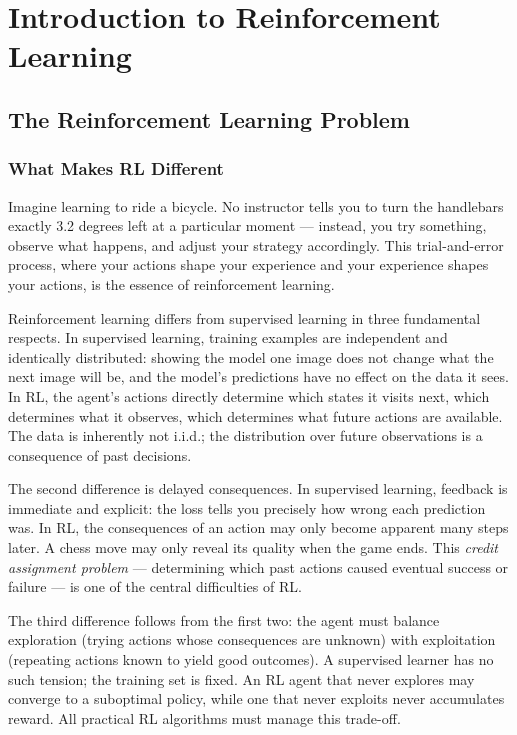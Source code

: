 \documentclass{book}
\begin{document}
\chapter{Introduction to Reinforcement Learning}
\label{ch:rl}

\section{The Reinforcement Learning Problem}
\label{sec:rl_problem}

\subsection{What Makes RL Different}
\label{sec:rl_different}

Imagine learning to ride a bicycle. No instructor tells you to turn the
handlebars exactly 3.2 degrees left at a particular moment --- instead,
you try something, observe what happens, and adjust your strategy
accordingly. This trial-and-error process, where your actions shape your
experience and your experience shapes your actions, is the essence of
reinforcement learning.

Reinforcement learning differs from supervised learning in three
fundamental respects. In supervised learning, training examples are
independent and identically distributed: showing the model one image does
not change what the next image will be, and the model's predictions have
no effect on the data it sees. In RL, the agent's actions directly
determine which states it visits next, which determines what it
observes, which determines what future actions are available. The data is
inherently not i.i.d.; the distribution over future observations is a
consequence of past decisions.

The second difference is delayed consequences. In supervised learning,
feedback is immediate and explicit: the loss tells you precisely how wrong
each prediction was. In RL, the consequences of an action may only become
apparent many steps later. A chess move may only reveal its quality when
the game ends. This \emph{credit assignment problem} --- determining which
past actions caused eventual success or failure --- is one of the central
difficulties of RL.

The third difference follows from the first two: the agent must balance
exploration (trying actions whose consequences are unknown) with
exploitation (repeating actions known to yield good outcomes). A supervised
learner has no such tension; the training set is fixed. An RL agent that
never explores may converge to a suboptimal policy, while one that never
exploits never accumulates reward. All practical RL algorithms must manage
this trade-off.
\end{document}

